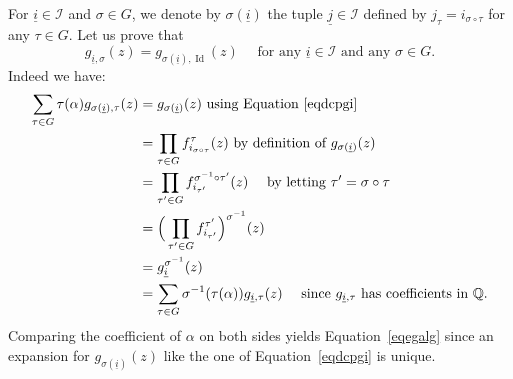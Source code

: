 \documentclass[11pt]{article}
\numberwithin{equation}{section}
\theoremstyle{definition}
\newcommand{\Q}{\mathbb{Q}}
\DeclareMathOperator{\Id}{Id}
\newcommand{\calI}{\mathcal I}
\newcommand{\isoul}{{\underline{i}}}
\newcommand{\jsoul}{{\underline{j}}}
\begin{document}
For $ \isoul\in\calI$ and $\sigma\in G$, we denote by $\sigma(\isoul)$ the tuple $\jsoul\in\calI$ defined by $j_\tau = i_{\sigma\circ\tau}$ for any $\tau\in G$. Let us prove that
\begin{equation} \label{eqegalg}
g_{\isoul,\sigma}(z) = g_{\sigma(\isoul),\Id}(z) \quad \mbox{ for any } \isoul\in\calI
\mbox{ and any } \sigma\in G.
\end{equation}
Indeed we have:
\begin{align*}
\sum_{\tau\in G} \tau(\alpha) g_{\sigma(\isoul),\tau}(z)
&=
g_{\sigma(\isoul)}(z) \mbox{ using Equation~\eqref{eqdcpgi}}
\\
&=
\prod_{\tau\in G} f_{i_{\sigma\circ\tau}}^\tau(z)
\mbox{ by definition of $g_{\sigma(\isoul)}(z)$}
\\
&=
\prod_{\tau'\in G} f_{i_{ \tau'}}^{\sigma^{-1}\circ \tau'}(z) \quad \mbox{ by letting }
\tau' = \sigma\circ\tau\\
&=
\Big( \prod_{\tau'\in G} f_{i_{ \tau'}}^{ \tau'}\Big)^{\sigma^{-1}}(z)\\
&= g_\isoul^{\sigma^{-1}}(z) \\
&=
\sum_{\tau\in G} \sigma^{-1}(\tau(\alpha)) g_{ \isoul ,\tau}(z)
\quad \mbox{ since $g_{ \isoul ,\tau} $ has coefficients in $\Q$.}
\end{align*}
Comparing the coefficient of $\alpha$ on both sides yields Equation~\eqref{eqegalg} since an expansion for $g_{\sigma(\isoul)}(z)$ like the one of Equation~\eqref{eqdcpgi} is unique.
\end{document}
